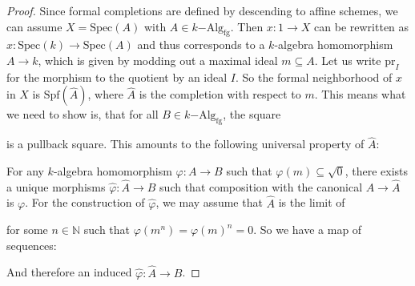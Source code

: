 \documentclass[9pt,twosided]{amsart}
\newcommand{\bN}{\mathbb N}
\newcommand{\Spec}{\ensuremath{\mathrm{Spec}}}
\newcommand{\Spf}{\ensuremath{\mathrm{Spf}}}
\newcommand{\fgkAlg}{\ensuremath{k\mathrm{-Alg}_{\mathrm{fg}}}}
\newcommand{\fgkAlgTop}{\ensuremath{k\mathrm{-Alg}_{\mathrm{fg,top}}}}
\begin{document}
\begin{proof}
  Since formal completions are defined by descending to affine schemes, we can assume $X=\Spec(A)$ with $A\in\fgkAlg$.
  Then $x:1\to X$ can be rewritten as $x:\Spec(k)\to\Spec(A)$ and thus corresponds to a $k$-algebra homomorphism $A\to k$,
  which is given by modding out a maximal ideal $m\subseteq A$. Let us write $\mathrm{pr}_I$ for the morphism to the quotient by an ideal $I$.
  So the formal neighborhood of $x$ in $X$ is $\Spf(\hat{A})$, where $\hat{A}$ is the completion with respect to $m$.
  This means what we need to show is, that for all $B\in\fgkAlg$, the square
  \begin{center}
  \end{center}
  is a pullback square. This amounts to the following universal property of $\hat{A}$:

  For any $k$-algebra homomorphism $\varphi:A\to B$ such that $\varphi(m)\subseteq \sqrt{0}$, there exists a unique morphisms
  $\hat{\varphi}:\hat{A}\to B$ such that composition with the canonical $A\to\hat{A}$ is $\varphi$.
  For the construction of $\hat{\varphi}$, we may assume that $\hat{A}$ is the limit of
  \begin{center}
  \end{center}
  for some $n\in\bN$ such that $\varphi(m^n)=\varphi(m)^n={0}$. So we have a map of sequences:
  \begin{center}
  \end{center}
  And therefore an induced $\hat{\varphi}:\hat{A}\to B$.
\end{proof}
\end{document}
